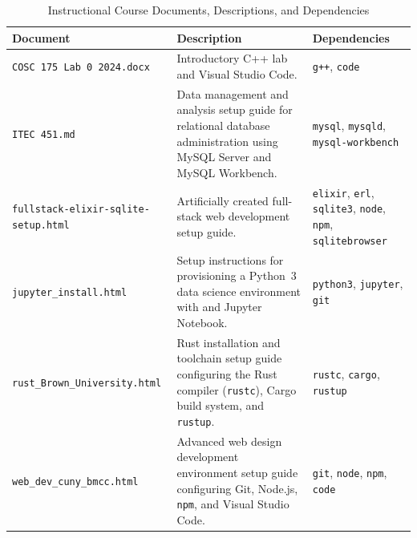 \begin{table}[htbp]
	\centering
	\small
	\caption{Instructional Course Documents, Descriptions, and Dependencies}
	\label{tab:coursework-documents}
	\begin{tabularx}
		{\textwidth}{@{}l >{\RaggedRight\arraybackslash}X >{\RaggedRight\arraybackslash}p{3.4cm}@{}}
		\toprule \textbf{Document}                                          & \textbf{Description}                                                     & \textbf{Dependencies}
		\\ \midrule \texttt{COSC 175 Lab 0 2024.docx} & Introductory C++ lab and
		Visual Studio Code.                                                 & \texttt{g++}, \texttt{code}                                                                      \\ \addlinespace
		\texttt{ITEC 451.md}                                                & Data management and analysis setup guide for relational
		database administration using MySQL Server and MySQL Workbench.     &
		\texttt{mysql}, \texttt{mysqld}, \texttt{mysql-workbench}                                                                                                              \\ \addlinespace
		\texttt{fullstack-elixir-sqlite-setup.html}                         & Artificially created full-stack
		web development setup guide.                                        & \texttt{elixir}, \texttt{erl}, \texttt{sqlite3},
		\texttt{node}, \texttt{npm}, \texttt{sqlitebrowser}                                                                                                                    \\ \addlinespace
		\texttt{jupyter\_install.html}                                      & Setup instructions for provisioning a Python~3
		data science environment with and Jupyter Notebook.                 & \texttt{python3},
		\texttt{jupyter}, \texttt{git}                                                                                                                                         \\ \addlinespace \texttt{rust\_Brown\_University.html}
		                                                                    & Rust installation and toolchain setup guide configuring the Rust
		compiler (\texttt{rustc}), Cargo build system, and \texttt{rustup}. & \texttt{rustc},
		\texttt{cargo}, \texttt{rustup}                                                                                                                                        \\ \addlinespace \texttt{web\_dev\_cuny\_bmcc.html}
		                                                                    & Advanced web design development environment setup guide configuring Git,
		Node.js, \texttt{npm}, and Visual Studio Code.                      & \texttt{git}, \texttt{node},
		\texttt{npm}, \texttt{code}                                                                                                                                            \\ \bottomrule
	\end{tabularx}
\end{table}

